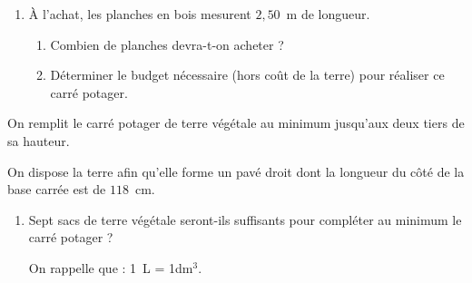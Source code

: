 \documentclass[exercice,a4]{thedocument}%
\begin{document}
\smallskip

\begin{enumerate}
\item À l'achat, les planches en bois mesurent $2,50$~m de longueur.
	\begin{enumerate}
		\item Combien de planches devra-t-on acheter ?
		\item Déterminer le budget nécessaire (hors coût de la terre) pour réaliser ce carré potager.
	\end{enumerate}
\end{enumerate}

On remplit le carré potager de terre végétale au minimum jusqu'aux deux tiers de sa hauteur.

On dispose la terre afin qu'elle forme un pavé droit dont la longueur du côté de la base carrée est de $118$~cm.

\begin{enumerate}[resume]
\item Sept sacs de terre végétale seront-ils suffisants pour compléter au minimum le carré potager ?

On rappelle que : 1~L = 1dm$^3$.
\end{enumerate}

\showthesource
\end{document}
